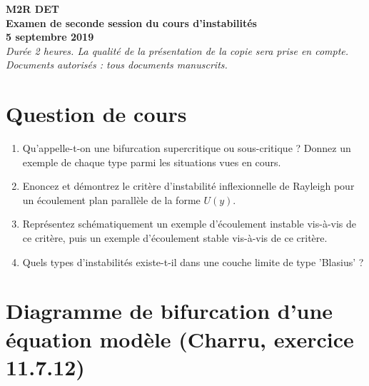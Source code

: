 \documentclass[a4paper,11pt]{article}
\begin{document}
{\Large
\noindent

\begin{center}

{\bf M2R DET \\
 Examen de seconde session du cours d'instabilités \\ 
 5 septembre  2019
 } \\
{\it \small Durée 2 heures. La qualité de la présentation de la copie sera prise en compte. 
} \\
{\it \small Documents autorisés : tous documents manuscrits.}
\end{center}
}

%

\section{Question de cours}

\begin{enumerate}

\item Qu'appelle-t-on une bifurcation supercritique ou sous-critique ? Donnez un exemple de chaque type parmi les situations vues en cours.

\item Enoncez et démontrez le critère d'instabilité inflexionnelle de Rayleigh pour un écoulement plan parallèle de la forme $U(y)$.

\item Représentez schématiquement un exemple d'écoulement instable vis-à-vis de ce critère, puis un exemple d'écoulement stable vis-à-vis de ce critère.


\item Quels types d'instabilités existe-t-il dans une couche limite de type 'Blasius' ?



\end{enumerate}

\section{Diagramme de bifurcation d'une équation modèle (Charru, exercice 11.7.12)}  
\end{document}
